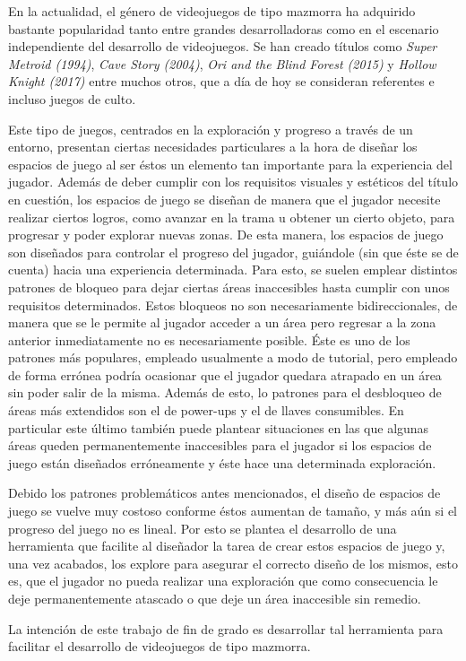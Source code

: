 En la actualidad, el género de videojuegos de tipo mazmorra ha adquirido bastante popularidad tanto entre grandes desarrolladoras como en el escenario independiente del desarrollo de videojuegos. Se han creado títulos como \textit{Super Metroid (1994)}, \textit{Cave Story (2004)}, \textit{Ori and the Blind Forest (2015)} y \textit{Hollow Knight (2017)} entre muchos otros, que a día de hoy se consideran referentes e incluso juegos de culto.\newline

Este tipo de juegos, centrados en la exploración y progreso a través de un entorno, presentan ciertas necesidades particulares a la hora de diseñar los espacios de juego al ser éstos un elemento tan importante para la experiencia del jugador.
Además de deber cumplir con los requisitos visuales y estéticos del título en cuestión, los espacios de juego se diseñan de manera que el jugador necesite realizar ciertos logros, como avanzar en la trama u obtener un cierto objeto, para progresar y poder explorar nuevas zonas. De esta manera, los espacios de juego son diseñados para controlar el progreso del jugador, guiándole (sin que éste se de cuenta) hacia una experiencia determinada.\newline
Para esto, se suelen emplear distintos patrones de bloqueo para dejar ciertas áreas inaccesibles hasta cumplir con unos requisitos determinados. Estos bloqueos no son necesariamente bidireccionales, de manera que se le permite al jugador acceder a un área pero regresar a la zona anterior inmediatamente no es necesariamente posible. Éste es uno de los patrones más populares, empleado usualmente a modo de tutorial, pero empleado de forma errónea podría ocasionar que el jugador quedara atrapado en un área sin poder salir de la misma.
Además de esto, lo patrones para el desbloqueo de áreas más extendidos son el de power-ups y el de llaves consumibles. En particular este último también puede plantear situaciones en las que algunas áreas queden permanentemente inaccesibles para el jugador si los espacios de juego están diseñados erróneamente y éste hace una determinada exploración.\newline

Debido los patrones problemáticos antes mencionados, el diseño de espacios de juego se vuelve muy costoso conforme éstos aumentan de tamaño, y más aún si el progreso del juego no es lineal. Por esto se plantea el desarrollo de una herramienta que facilite al diseñador la tarea de crear estos espacios de juego y, una vez acabados, los explore para asegurar el correcto diseño de los mismos, esto es, que el jugador no pueda realizar una exploración que como consecuencia le deje permanentemente atascado o que deje un área inaccesible sin remedio.

La intención de este trabajo de fin de grado es desarrollar tal herramienta para facilitar el desarrollo de videojuegos de tipo mazmorra.
